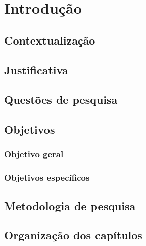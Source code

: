 \chapter[Introdução]{Introdução}

\citeyear{mcarthur2007multi}


\section{Contextualização}

\section{Justificativa}

\section{Questões de pesquisa}

\section{Objetivos}

\subsection{Objetivo geral}

\subsection{Objetivos específicos}

\section{Metodologia de pesquisa}

\section{Organização dos capítulos}
    







